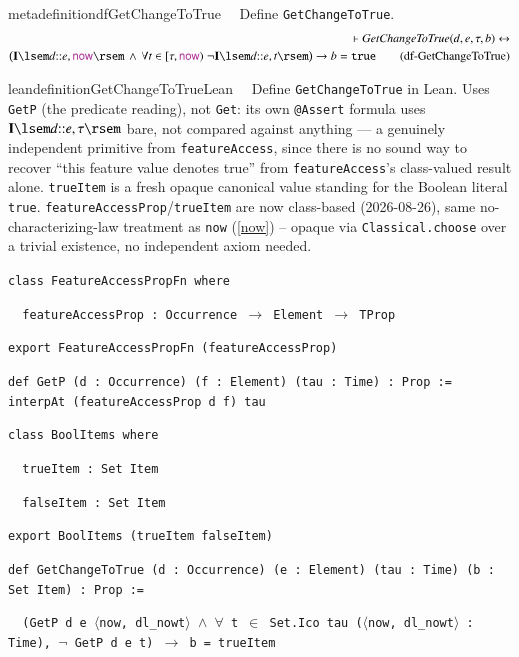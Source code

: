 \begin{restatable}{metadefinition}{dfGetChangeToTrue}~~ Define
\texttt{GetChangeToTrue}.
\begin{align}
\vdash \textit{GetChangeToTrue}(d,e,\tau,b) \leftrightarrow \notag \\
  \big( \mathbf{I}\lsem d{::}e,\mathsf{\mc{now}}\rsem \, \wedge \,
  \forall t \in [\tau,\mathsf{\mc{now}}) \; \lnot \mathbf{I}\lsem d{::}e,t\rsem \big)
  \rightarrow b = \texttt{true}
\label{eq:df-GetChangeToTrue}\tag{df-GetChangeToTrue}
\end{align}
\end{restatable}

\begin{restatable}{leandefinition}{GetChangeToTrueLean}~~ Define \texttt{GetChangeToTrue}
in Lean. Uses \texttt{GetP} (the predicate reading), not \texttt{Get}: its own \texttt{@Assert} formula uses
$\mathbf{I}\lsem d{::}e,\tau\rsem$ bare, not compared against anything --- a genuinely independent primitive
from \texttt{featureAccess}, since there is no sound way to recover ``this feature value denotes true'' from
\texttt{featureAccess}'s class-valued result alone. \texttt{trueItem} is a fresh opaque canonical value
standing for the Boolean literal \texttt{true}. \texttt{featureAccessProp}/\texttt{trueItem} are now
class-based (2026-08-26), same no-characterizing-law treatment as \texttt{now} (\ref{now}) -- opaque via
\texttt{Classical.choose} over a trivial existence, no independent axiom needed.

\texttt{\textcolor{leancolor}{class} \textcolor{leanyellow}{FeatureAccessPropFn} \textcolor{leancolor}{where}}

\texttt{~~featureAccessProp : Occurrence $\to$ Element $\to$ TProp}

\texttt{\textcolor{leancolor}{export} FeatureAccessPropFn (featureAccessProp)}

\texttt{\textcolor{leancolor}{def} \textcolor{leanyellow}{GetP} (d : Occurrence) (f : Element) (tau : Time) : Prop := interpAt (featureAccessProp d f) tau}

\texttt{\textcolor{leancolor}{class} \textcolor{leanyellow}{BoolItems} \textcolor{leancolor}{where}}

\texttt{~~trueItem : Set Item}

\texttt{~~falseItem : Set Item}

\texttt{\textcolor{leancolor}{export} BoolItems (trueItem falseItem)}

\texttt{\textcolor{leancolor}{def} \textcolor{leanyellow}{GetChangeToTrue} (d : Occurrence) (e : Element) (tau : Time) (b : Set Item) : Prop :=}

\texttt{~~(GetP d e $\langle$now, dl\_nowt$\rangle$ $\wedge$ $\forall$ t $\in$ Set.Ico tau
($\langle$now, dl\_nowt$\rangle$ : Time), $\lnot$ GetP d e t) $\to$ b = trueItem}
\label{GetChangeToTrue}
\end{restatable}

